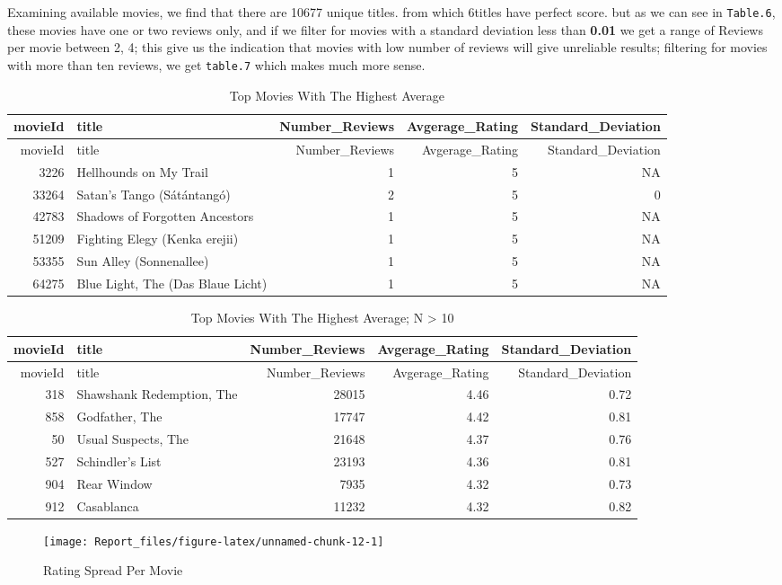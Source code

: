 \documentclass[]{article}
\begin{document}
Examining available movies, we find that there are 10677 unique titles.
from which 6titles have perfect score. but as we can see in
\texttt{Table.6}, these movies have one or two reviews only, and if we
filter for movies with a standard deviation less than \textbf{0.01} we
get a range of Reviews per movie between 2, 4; this give us the
indication that movies with low number of reviews will give unreliable
results; filtering for movies with more than ten reviews, we get
\texttt{table.7} which makes much more sense.

\begin{longtable}[]{@{}rlrrr@{}}
\caption{Top Movies With The Highest Average}\tabularnewline
\toprule
movieId & title & Number\_Reviews & Avgerage\_Rating &
Standard\_Deviation\tabularnewline
\midrule
\endfirsthead
\toprule
movieId & title & Number\_Reviews & Avgerage\_Rating &
Standard\_Deviation\tabularnewline
\midrule
\endhead
3226 & Hellhounds on My Trail & 1 & 5 & NA\tabularnewline
33264 & Satan's Tango (Sátántangó) & 2 & 5 & 0\tabularnewline
42783 & Shadows of Forgotten Ancestors & 1 & 5 & NA\tabularnewline
51209 & Fighting Elegy (Kenka erejii) & 1 & 5 & NA\tabularnewline
53355 & Sun Alley (Sonnenallee) & 1 & 5 & NA\tabularnewline
64275 & Blue Light, The (Das Blaue Licht) & 1 & 5 & NA\tabularnewline
\bottomrule
\end{longtable}

\begin{longtable}[]{@{}rlrrr@{}}
\caption{Top Movies With The Highest Average; N \textgreater{}
10}\tabularnewline
\toprule
movieId & title & Number\_Reviews & Avgerage\_Rating &
Standard\_Deviation\tabularnewline
\midrule
\endfirsthead
\toprule
movieId & title & Number\_Reviews & Avgerage\_Rating &
Standard\_Deviation\tabularnewline
\midrule
\endhead
318 & Shawshank Redemption, The & 28015 & 4.46 & 0.72\tabularnewline
858 & Godfather, The & 17747 & 4.42 & 0.81\tabularnewline
50 & Usual Suspects, The & 21648 & 4.37 & 0.76\tabularnewline
527 & Schindler's List & 23193 & 4.36 & 0.81\tabularnewline
904 & Rear Window & 7935 & 4.32 & 0.73\tabularnewline
912 & Casablanca & 11232 & 4.32 & 0.82\tabularnewline
\bottomrule
\end{longtable}

\newpage

\begin{figure}

{\centering \texttt{[image: Report\_files/figure-latex/unnamed-chunk-12-1]} 

}

\caption{Rating Spread Per Movie}\label{fig:unnamed-chunk-12}
\end{figure}
\end{document}

